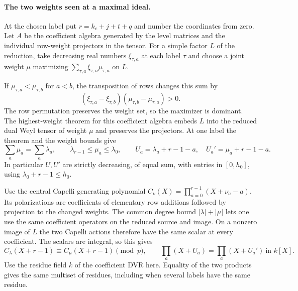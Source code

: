 \paragraph{The two weights seen at a maximal ideal.}
At the chosen label put \(r=k_c+j+t+q\) and number the
coordinates from zero. Let \(A\) be the coefficient algebra
generated by the level matrices and the individual row-weight
projectors in the tensor. For a simple factor \(L\) of the
reduction, take decreasing real numbers \(\xi_{\tau,a}\) at
each label \(\tau\) and choose a joint weight \(\mu\) maximizing
\(\sum_{\tau,a}\xi_{\tau,a}\mu_{\tau,a}\) on \(L\).

If
\(\mu_{\tau,a}<\mu_{\tau,b}\) for \(a<b\), the transposition
of rows changes this sum by
\[
        (\xi_{\tau,a}-\xi_{\tau,b})
                     (\mu_{\tau,b}-\mu_{\tau,a})>0 .
\]
The row permutation preserves the weight set, so the
maximizer is dominant. The highest-weight theorem for this
coefficient algebra embeds \(L\) into the reduced dual Weyl
tensor of weight \(\mu\) and preserves the projectors. At one
label the theorem and the weight bounds give
\[
 \sum_a\mu_a=\sum_a\lambda_a,\qquad
 \lambda_{r-1}\le\mu_a\le\lambda_0,\qquad
 U_a=\lambda_a+r-1-a,\quad U_a'=\mu_a+r-1-a .
\]
In particular \(U,U'\) are strictly decreasing, of equal sum,
with entries in \([0,h_0]\), using \(\lambda_0+r-1\le h_0\).
\label{cor:lift-crystalline-depth-1}

Use the central Capelli generating polynomial
\(C_\nu(X)=\prod_{a=0}^{r-1}(X+\nu_a-a)\).
Its polarizations are coefficients of elementary row additions
followed by projection to the changed weights. The common degree
bound \(|\lambda|+|\mu|\) lets one use the same coefficient
operators on the reduced source and image. On a nonzero image
of \(L\) the two Capelli actions therefore have the same scalar
at every coefficient. The scalars are integral, so this gives
\[
       C_\lambda(X+r-1)\equiv C_\mu(X+r-1)\pmod p,
       \qquad \prod_a(X+U_a)=\prod_a(X+U_a')\ \text{in }k[X].
\]
Use the residue field \(k\) of the coefficient DVR here. Equality
of the two products gives the same multiset of residues, including
when several labels have the same residue.
\label{cor:lift-crystalline-depth-2}

